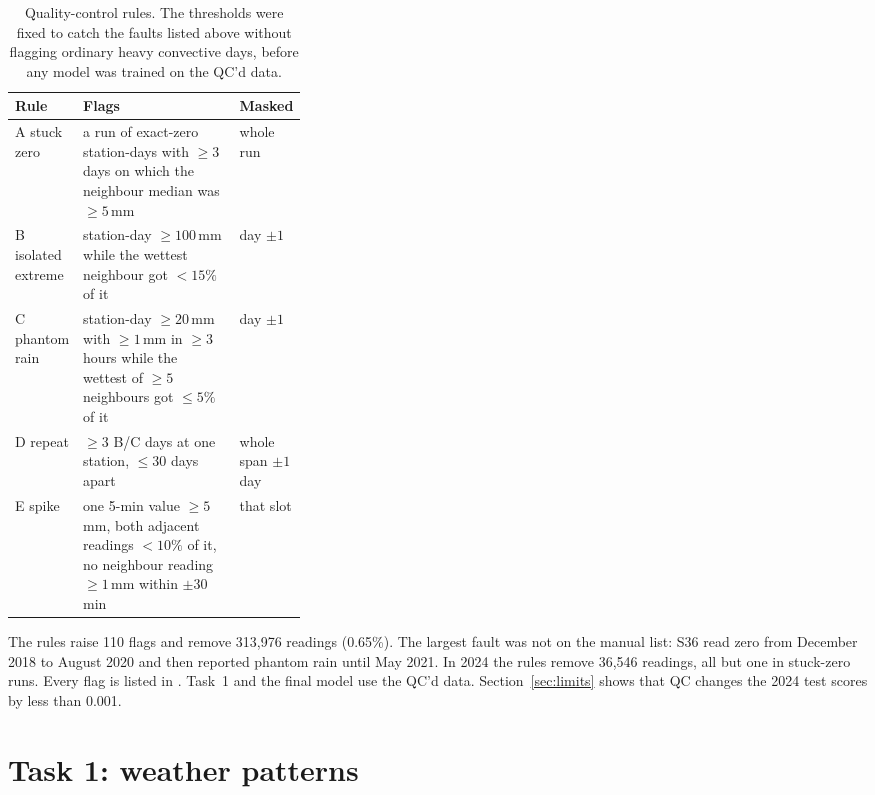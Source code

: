 \documentclass[lang=en,11pt,a4paper,bibend=bibtex]{elegantpaper}
\newcommand{\mm}{\,mm}
\begin{document}
\begin{table}[H]
\centering\small
\caption{Quality-control rules. The thresholds were fixed to catch the faults listed above without flagging ordinary heavy convective days, before any model was trained on the QC'd data.}\label{tab:qc}
\renewcommand{\arraystretch}{1.15}
\begin{tabularx}{\linewidth}{@{}p{0.17\linewidth}Yp{0.17\linewidth}@{}}
\toprule
\textbf{Rule} & \textbf{Flags} & \textbf{Masked} \\
\midrule
A stuck zero & a run of exact-zero station-days with $\ge 3$ days on which the neighbour median was $\ge 5$\mm & whole run \\
B isolated extreme & station-day $\ge 100$\mm{} while the wettest neighbour got $<15\%$ of it & day $\pm 1$ \\
C phantom rain & station-day $\ge 20$\mm{} with $\ge 1$\mm{} in $\ge 3$ hours while the wettest of $\ge 5$ neighbours got $\le 5\%$ of it & day $\pm 1$ \\
D repeat & $\ge 3$ B/C days at one station, $\le 30$ days apart & whole span $\pm 1$ day \\
E spike & one 5-min value $\ge 5$\mm, both adjacent readings $<10\%$ of it, no neighbour reading $\ge 1$\mm{} within $\pm 30$\,min & that slot \\
\bottomrule
\end{tabularx}
\end{table}
The rules raise 110 flags and remove 313,976 readings (0.65\%). The largest fault was not on the manual list: S36 read zero from December 2018 to August 2020 and then reported phantom rain until May 2021. In 2024 the rules remove 36,546 readings, all but one in stuck-zero runs. Every flag is listed in . Task~1 and the final model use the QC'd data. Section~\ref{sec:limits} shows that QC changes the 2024 test scores by less than 0.001.

\section{Task 1: weather patterns}\label{sec:task1}
\end{document}
